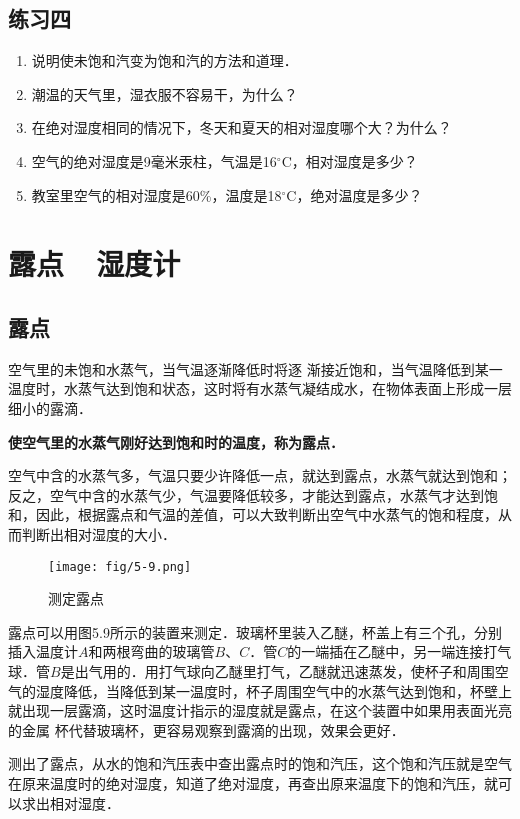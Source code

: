 \subsection*{练习四}

\begin{enumerate}
	\item 说明使未饱和汽变为饱和汽的方法和道理．
\item 潮温的天气里，湿衣服不容易干，为什么？
\item 在绝对湿度相同的情况下，冬天和夏天的相对湿度哪个大？为什么？
\item 空气的绝对湿度是9毫米汞柱，气温是16$^\circ$C，相对湿度是多少？
\item 教室里空气的相对湿度是60\%，温度是18$^\circ$C，绝对温度是多少？
\end{enumerate}

\section{露点~~湿度计}
\subsection{露点} 
空气里的未饱和水蒸气，当气温逐渐降低时将逐
渐接近饱和，当气温降低到某一温度时，水蒸气达到饱和状态，这时将有水蒸气凝结成水，在物体表面上形成一层细小的露滴．

\textbf{使空气里的水蒸气刚好达到饱和时的温度，称为露点．}

空气中含的水蒸气多，气温只要少许降低一点，就达到露点，水蒸气就达到饱和；反之，空气中含的水蒸气少，气温要降低较多，才能达到露点，水蒸气才达到饱和，因此，根据露点和气温的差值，可以大致判断出空气中水蒸气的饱和程度，从而判断出相对湿度的大小．
\begin{figure}[htp]
\centering
\texttt{[image: fig/5-9.png]}
\caption{测定露点}
\end{figure}

露点可以用图5.9所示的装置来测定．玻璃杯里装入乙醚，杯盖上有三个孔，分别插入温度计$A$和两根弯曲的玻璃管$B$、$C$．管$C$的一端插在乙醚中，另一端连接打气球．管$B$是出气用的．用打气球向乙醚里打气，乙醚就迅速蒸发，使杯子和周围空气的湿度降低，当降低到某一温度时，杯子周围空气中的水蒸气达到饱和，杯壁上就出现一层露滴，这时温度计指示的湿度就是露点，在这个装置中如果用表面光亮的金属
杯代替玻璃杯，更容易观察到露滴的出现，效果会更好．

测出了露点，从水的饱和汽压表中查出露点时的饱和汽压，这个饱和汽压就是空气在原来温度时的绝对湿度，知道了绝对湿度，再查出原来温度下的饱和汽压，就可以求出相对湿度．

